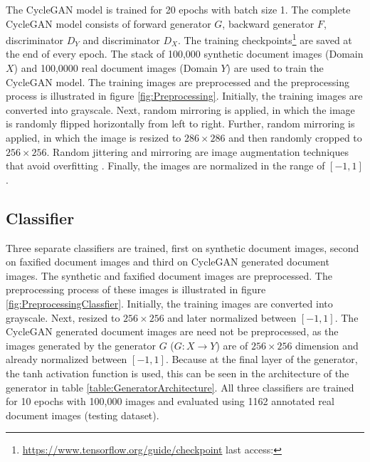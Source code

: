 The \ac{CycleGAN} model is trained for 20 epochs with batch size 1. The complete \ac{CycleGAN} model consists of forward generator $G$, backward generator $F$, discriminator $D_Y$ and discriminator $D_X$. The training checkpoints\footnote{\url{https://www.tensorflow.org/guide/checkpoint} last access: \dcdate} are saved at the end of every epoch. The stack of 100,000 synthetic document images (Domain $X$) and 100,0000 real document images (Domain $Y$) are used to train the \ac{CycleGAN} model. The training images are preprocessed and the preprocessing process is illustrated in figure \ref{fig:Preprocessing}. Initially, the training images are converted into grayscale. Next, random mirroring is applied, in which the image is randomly flipped horizontally from left to right. Further, random mirroring is applied, in which the image is resized to $286 \times 286$ and then randomly cropped to $256 \times 256$. Random jittering and mirroring are image augmentation techniques that avoid overfitting \cite{zhu2020unpaired}. Finally, the images are normalized in the range of $[-1, 1]$.


\subsection{Classifier}

Three separate classifiers are trained, first on synthetic document images, second on faxified document images and third on \ac{CycleGAN} generated document images. The synthetic and faxified document images are preprocessed. The preprocessing process of these images is illustrated in figure \ref{fig:PreprocessingClassfier}. Initially, the training images are converted into grayscale. Next, resized to $256 \times 256$ and later normalized between $[-1, 1]$. The \ac{CycleGAN} generated document images are need not be preprocessed, as the images generated by the generator $G$ ($G : X \rightarrow Y$) are of $256 \times 256$ dimension and already normalized between $[-1, 1]$. Because at the final layer of the generator, the tanh activation function is used, this can be seen in the architecture of the generator in table \ref{table:GeneratorArchitecture}. All three classifiers are trained for 10 epochs with 100,000 images and evaluated using 1162 annotated real document images (testing dataset).


